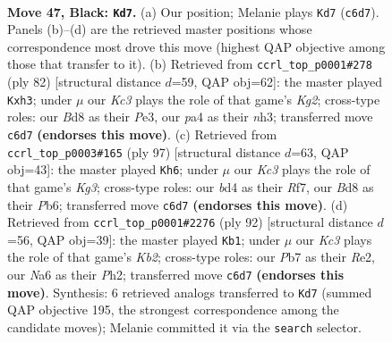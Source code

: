 \documentclass[11pt]{article}
\begin{document}
\begin{figure}[p]\centering
\begin{subfigure}{0.46\textwidth}\centering
\resizebox{\linewidth}{!}{%
\newchessgame
\chessboard[
  setfen={r2b4/1p5p/n1k3pP/p4p2/P2BrN2/3R2P1/8/2R4K b - - 2 47},
  showmover=false,
  pgfstyle=straightmove, color=movearrow, markmove={c6-d7}
]}
\caption{}
\end{subfigure}\hfill
\begin{subfigure}{0.46\textwidth}\centering
\resizebox{\linewidth}{!}{%
\newchessgame
\chessboard[
  setfen={1b2r3/6k1/6r1/p6p/4p2P/PP2P2n/2R2PK1/2R2N2 w - - 2 42},
  showmover=false,
  pgfstyle=straightmove, color=movearrow, markmove={g2-h3}
]}
\caption{}
\end{subfigure}
\\[4pt]
\begin{subfigure}{0.46\textwidth}\centering
\resizebox{\linewidth}{!}{%
\newchessgame
\chessboard[
  setfen={8/2p2r2/1pb3k1/2p4n/p3N1R1/P2P4/1PP1N3/6K1 b - - 9 49},
  showmover=false,
  pgfstyle=straightmove, color=movearrow, markmove={g6-h6}
]}
\caption{}
\end{subfigure}\hfill
\begin{subfigure}{0.46\textwidth}\centering
\resizebox{\linewidth}{!}{%
\newchessgame
\chessboard[
  setfen={8/2p2p2/2B2k1p/2bP2p1/2r5/1N1n2P1/PK2RP1P/8 w - - 7 47},
  showmover=false,
  pgfstyle=straightmove, color=movearrow, markmove={b2-b1}
]}
\caption{}
\end{subfigure}
\caption{\textbf{Move 47, Black: \texttt{Kd7}.} (a) Our position; Melanie plays \texttt{Kd7} (\texttt{c6d7}). Panels (b)--(d) are the retrieved master positions whose correspondence most drove this move (highest QAP objective among those that transfer to it). (b) Retrieved from \texttt{ccrl\_top\_p0001\#278} (ply 82) [structural distance $d$=59, QAP obj=62]: the master played \texttt{Kxh3}; under $\mu$ our \emph{Kc3} plays the role of that game's \emph{Kg2}; cross-type roles: our \emph{B}d8 as their \emph{P}e3, our \emph{p}a4 as their \emph{n}h3; transferred move \texttt{c6d7} \textbf{(endorses this move)}. (c) Retrieved from \texttt{ccrl\_top\_p0003\#165} (ply 97) [structural distance $d$=63, QAP obj=43]: the master played \texttt{Kh6}; under $\mu$ our \emph{Kc3} plays the role of that game's \emph{Kg3}; cross-type roles: our \emph{b}d4 as their \emph{R}f7, our \emph{B}d8 as their \emph{P}b6; transferred move \texttt{c6d7} \textbf{(endorses this move)}. (d) Retrieved from \texttt{ccrl\_top\_p0001\#2276} (ply 92) [structural distance $d$=56, QAP obj=39]: the master played \texttt{Kb1}; under $\mu$ our \emph{Kc3} plays the role of that game's \emph{Kb2}; cross-type roles: our \emph{P}b7 as their \emph{R}e2, our \emph{N}a6 as their \emph{P}h2; transferred move \texttt{c6d7} \textbf{(endorses this move)}. Synthesis: 6 retrieved analogs transferred to \texttt{Kd7} (summed QAP objective 195, the strongest correspondence among the candidate moves); Melanie committed it via the \texttt{search} selector.}
\label{fig:thought-m93}
\end{figure}
\end{document}
